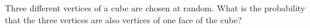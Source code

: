 Three different vertices of a cube are chosen at random. What is the probability that the three vertices are also vertices of one face of the cube?
